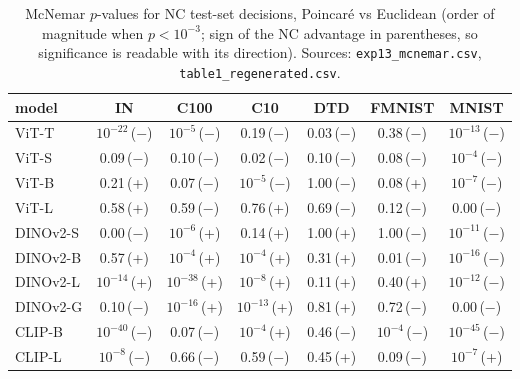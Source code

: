 \begin{table}[H]
\centering
\small
\begin{tabular}{lcccccc}
\toprule
model & IN & C100 & C10 & DTD & FMNIST & MNIST \\
\midrule
ViT-T & $10^{-22}$\,($-$) & $10^{-5}$\,($-$) & 0.19\,($-$) & 0.03\,($-$) & 0.38\,($-$) & $10^{-13}$\,($-$) \\
ViT-S & 0.09\,($-$) & 0.10\,($-$) & 0.02\,($-$) & 0.10\,($-$) & 0.08\,($-$) & $10^{-4}$\,($-$) \\
ViT-B & 0.21\,(+) & 0.07\,($-$) & $10^{-5}$\,($-$) & 1.00\,($-$) & 0.08\,(+) & $10^{-7}$\,($-$) \\
ViT-L & 0.58\,(+) & 0.59\,($-$) & 0.76\,(+) & 0.69\,($-$) & 0.12\,($-$) & 0.00\,($-$) \\
DINOv2-S & 0.00\,($-$) & $10^{-6}$\,(+) & 0.14\,(+) & 1.00\,(+) & 1.00\,($-$) & $10^{-11}$\,($-$) \\
DINOv2-B & 0.57\,(+) & $10^{-4}$\,(+) & $10^{-4}$\,(+) & 0.31\,(+) & 0.01\,($-$) & $10^{-16}$\,($-$) \\
DINOv2-L & $10^{-14}$\,(+) & $10^{-38}$\,(+) & $10^{-8}$\,(+) & 0.11\,(+) & 0.40\,(+) & $10^{-12}$\,($-$) \\
DINOv2-G & 0.10\,($-$) & $10^{-16}$\,(+) & $10^{-13}$\,(+) & 0.81\,(+) & 0.72\,($-$) & 0.00\,($-$) \\
CLIP-B & $10^{-40}$\,($-$) & 0.07\,($-$) & $10^{-4}$\,(+) & 0.46\,($-$) & $10^{-4}$\,($-$) & $10^{-45}$\,($-$) \\
CLIP-L & $10^{-8}$\,($-$) & 0.66\,($-$) & 0.59\,($-$) & 0.45\,(+) & 0.09\,($-$) & $10^{-7}$\,(+) \\
\bottomrule
\end{tabular}
\caption{McNemar $p$-values for NC test-set decisions, Poincar\'e vs Euclidean (order of magnitude when $p<10^{-3}$; sign of the NC advantage in parentheses, so significance is readable with its direction). Sources: \texttt{exp13\_mcnemar.csv}, \texttt{table1\_regenerated.csv}.}
\label{tab:a6}
\end{table}
